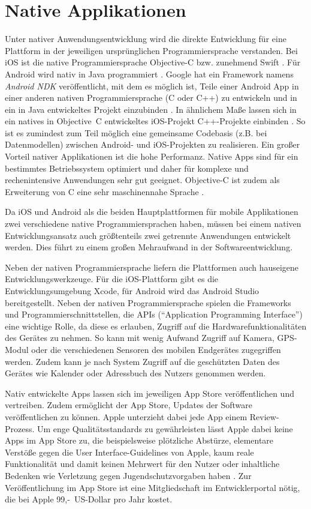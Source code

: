 \section{Native Applikationen}
\label{sec:nativeApplikationen}
%
Unter nativer Anwendungsentwicklung wird die direkte Entwicklung für eine Plattform in der jeweiligen ursprünglichen Programmiersprache verstanden. Bei iOS ist die native Programmiersprache Objective-C bzw. zunehmend Swift \cite{appleDokuSwift}. Für Android wird nativ in Java programmiert \cite{googleAndroidDoku}. Google hat ein Framework namens \emph{Android NDK} veröffentlicht, mit dem es möglich ist, Teile einer Android App in einer anderen nativen Programmiersprache (C oder C++) zu entwickeln und in ein in Java entwickeltes Projekt einzubinden \cite{googleAndroidNDKDoku}. In ähnlichem Maße lassen sich in ein natives in Objective~C entwickeltes iOS-Projekt C++-Projekte einbinden \cite{appleDokuCppObjectiveC}. So ist es zumindest zum Teil möglich eine gemeinsame Codebasis (z.B. bei Datenmodellen) zwischen Android- und iOS-Projekten zu realisieren.
Ein großer Vorteil nativer Applikationen ist die hohe Performanz. Native Apps sind für ein bestimmtes Betriebssystem optimiert und daher für komplexe und rechenintensive Anwendungen sehr gut geeignet. Objective-C ist zudem als Erweiterung von C eine sehr maschinennahe Sprache \cite{appleObjectiveC}. 

Da iOS und Android als die beiden Hauptplattformen für mobile Applikationen zwei verschiedene native Programmiersprachen haben, müssen bei einem nativen Entwicklungsansatz auch größtenteils zwei getrennte Anwendungen entwickelt werden. Dies führt zu einem großen Mehraufwand in der Softwareentwicklung.

Neben der nativen Programmiersprache liefern die Plattformen auch hauseigene Entwicklungswerkzeuge. Für die iOS-Plattform gibt es die Entwicklungsumgebung Xcode, für Android wird das Android Studio bereitgestellt. Neben der nativen Programmiersprache spielen die Frameworks und Programmierschnittstellen, die APIs (\enquote{Application Programming Interface}) eine wichtige Rolle, da diese es erlauben, Zugriff auf die Hardwarefunktionalitäten des Gerätes zu nehmen. So kann mit wenig Aufwand Zugriff auf Kamera, GPS-Modul oder die verschiedenen Sensoren des mobilen Endgerätes zugegriffen werden. Zudem kann je nach System Zugriff auf die geschützten Daten des Gerätes wie Kalender oder Adressbuch des Nutzers genommen werden. 

Nativ entwickelte Apps lassen sich im jeweiligen App Store veröffentlichen und vertreiben. Zudem ermöglicht der App Store, Updates der Software veröffentlichen zu können. Apple unterzieht dabei jede App einem Review-Prozess. Um enge Qualitätsstandards zu gewährleisten lässt Apple dabei keine Apps im App Store zu, die beispielsweise plötzliche Abstürze, elementare Verstöße gegen die User Interface-Guidelines von Apple, kaum reale Funktionalität und damit keinen Mehrwert für den Nutzer oder inhaltliche Bedenken wie Verletzung gegen Jugendschutzvorgaben haben \cite{appleReview}. Zur Veröffentlichung im App Store ist eine Mitgliedschaft im Entwicklerportal nötig, die bei Apple 99,-~US-Dollar pro Jahr kostet. 
%
